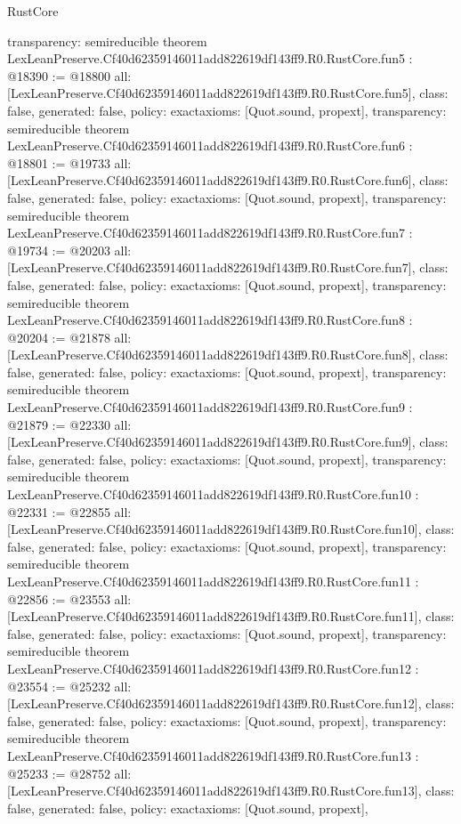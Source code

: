 \begin{lexlean}{RustCore}
\begin{coremodule}
{  transparency: semireducible
}
theorem LexLeanPreserve.Cf40d62359146011add822619df143ff9.R0.RustCore.fun5 : @18390 := @18800 {
  all: [LexLeanPreserve.Cf40d62359146011add822619df143ff9.R0.RustCore.fun5],
  class: false,
  generated: false,
  policy: exact{axioms: [Quot.sound, propext]},
  transparency: semireducible
}
theorem LexLeanPreserve.Cf40d62359146011add822619df143ff9.R0.RustCore.fun6 : @18801 := @19733 {
  all: [LexLeanPreserve.Cf40d62359146011add822619df143ff9.R0.RustCore.fun6],
  class: false,
  generated: false,
  policy: exact{axioms: [Quot.sound, propext]},
  transparency: semireducible
}
theorem LexLeanPreserve.Cf40d62359146011add822619df143ff9.R0.RustCore.fun7 : @19734 := @20203 {
  all: [LexLeanPreserve.Cf40d62359146011add822619df143ff9.R0.RustCore.fun7],
  class: false,
  generated: false,
  policy: exact{axioms: [Quot.sound, propext]},
  transparency: semireducible
}
theorem LexLeanPreserve.Cf40d62359146011add822619df143ff9.R0.RustCore.fun8 : @20204 := @21878 {
  all: [LexLeanPreserve.Cf40d62359146011add822619df143ff9.R0.RustCore.fun8],
  class: false,
  generated: false,
  policy: exact{axioms: [Quot.sound, propext]},
  transparency: semireducible
}
theorem LexLeanPreserve.Cf40d62359146011add822619df143ff9.R0.RustCore.fun9 : @21879 := @22330 {
  all: [LexLeanPreserve.Cf40d62359146011add822619df143ff9.R0.RustCore.fun9],
  class: false,
  generated: false,
  policy: exact{axioms: [Quot.sound, propext]},
  transparency: semireducible
}
theorem LexLeanPreserve.Cf40d62359146011add822619df143ff9.R0.RustCore.fun10 : @22331 := @22855 {
  all: [LexLeanPreserve.Cf40d62359146011add822619df143ff9.R0.RustCore.fun10],
  class: false,
  generated: false,
  policy: exact{axioms: [Quot.sound, propext]},
  transparency: semireducible
}
theorem LexLeanPreserve.Cf40d62359146011add822619df143ff9.R0.RustCore.fun11 : @22856 := @23553 {
  all: [LexLeanPreserve.Cf40d62359146011add822619df143ff9.R0.RustCore.fun11],
  class: false,
  generated: false,
  policy: exact{axioms: [Quot.sound, propext]},
  transparency: semireducible
}
theorem LexLeanPreserve.Cf40d62359146011add822619df143ff9.R0.RustCore.fun12 : @23554 := @25232 {
  all: [LexLeanPreserve.Cf40d62359146011add822619df143ff9.R0.RustCore.fun12],
  class: false,
  generated: false,
  policy: exact{axioms: [Quot.sound, propext]},
  transparency: semireducible
}
theorem LexLeanPreserve.Cf40d62359146011add822619df143ff9.R0.RustCore.fun13 : @25233 := @28752 {
  all: [LexLeanPreserve.Cf40d62359146011add822619df143ff9.R0.RustCore.fun13],
  class: false,
  generated: false,
  policy: exact{axioms: [Quot.sound, propext]},
}
\end{coremodule}
\end{lexlean}
